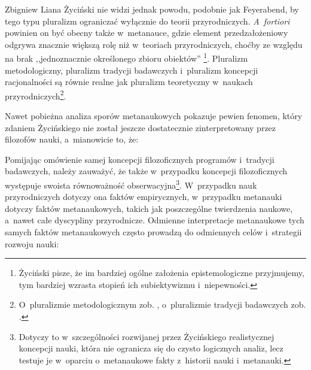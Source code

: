 \begin{artplenv}{Zbigniew Liana}
Życiński nie widzi jednak powodu, podobnie jak Feyerabend, by tego typu pluralizm ograniczać wyłącznie do teorii przyrodniczych. \textit{A~fortiori} powinien on być obecny także w~metanauce, gdzie element przedzałożeniowy odgrywa znacznie większą rolę niż w~teoriach przyrodniczych, choćby ze względu na brak ,,jednoznacznie określonego zbioru obiektów''
\parencite[][s.~163]{zycinski_teizm_1985}%
\footnote{Życiński 
\parencites*[][s.~143]{zycinski_structure_1988}[][s.~254]{zycinski_struktura_2013_liana} %
 pisze, że im bardziej ogólne założenia epistemologiczne przyjmujemy, tym bardziej wzrasta stopień ich subiektywizmu i~niepewności.}. Pluralizm metodologiczny, pluralizm tradycji badawczych i~pluralizm koncepcji racjonalności są równie realne jak pluralizm teoretyczny w~naukach przyrodniczych\footnote{O~pluralizmie metodologicznym zob. 
\parencites[][s.~198]{zycinski_structure_1988}[][s.~343]{zycinski_struktura_2013_liana}, %
 o~pluralizmie tradycji badawczych zob. 
\parencites[][s.~164]{zycinski_teizm_1985}[][s.~184]{zycinski_elementy_1996}[][s.~250]{zycinski_elementy_2015}.%
}.

Nawet pobieżna analiza sporów metanaukowych pokazuje pewien fenomen, który zdaniem Życińskiego nie został jeszcze dostatecznie zinterpretowany przez filozofów nauki, a~mianowicie to, że:


Pomijając omówienie samej koncepcji filozoficznych programów i~tradycji badawczych, należy zauważyć, że także w~przypadku koncepcji filozoficznych występuje swoista równoważność obserwacyjna\footnote{Dotyczy to w~szczególności rozwijanej przez Życińskiego realistycznej koncepcji nauki, która nie ogranicza się do czysto logicznych analiz, lecz testuje je w~oparciu o~metanaukowe fakty z~historii nauki i~metanauki.}. W~przypadku nauk przyrodniczych dotyczy ona faktów empirycznych, w~przypadku metanauki dotyczy faktów metanaukowych, takich jak poszczególne twierdzenia naukowe, a~nawet całe dyscypliny przyrodnicze. Odmienne interpretacje metanaukowe tych samych faktów metanaukowych często prowadzą do odmiennych celów i~strategii rozwoju nauki:


\end{artplenv}
